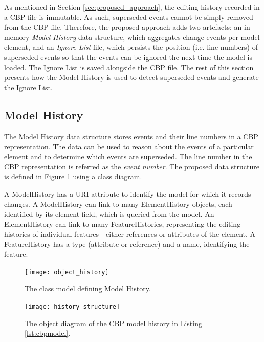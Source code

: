 As mentioned in Section \ref{sec:proposed_approach}, the editing history recorded in a CBP file is immutable. As such, superseded events cannot be simply removed from the CBP file. Therefore, the proposed approach adds two artefacts: an in-memory \textit{Model History} data structure, which aggregates change events per model element, and an \textit{Ignore List} file, which persists the position (i.e. line numbers) of superseded events so that the events can be ignored the next time the model is loaded. The Ignore List is saved alongside the CBP file. The rest of this section presents how the Model History is used to detect superseded events and generate the Ignore List.

\subsection{Model History}
\label{subsec:model_history}
The Model History data structure stores events and their line numbers in a CBP representation. The data can be used to reason about the events of a particular element and to determine which events are superseded. The line number in the CBP representation is referred as the \textit{event number}. The proposed data structure is defined in Figure \ref{fig:object_history} using a class diagram.

A \textsf{ModelHistory} has a \textsf{URI} attribute to identify the model for which it records changes. A \textsf{ModelHistory} can link to many \textsf{ElementHistory} objects, each identified by its \textsf{element} field, which is queried from the model. An \textsf{ElementHistory} can link to many \textsf{FeatureHistories}, representing the editing histories of individual features—either references or attributes of the element. A \textsf{FeatureHistory} has a \textsf{type} (attribute or reference) and a \textsf{name}, identifying the feature.

\begin{figure}[ht]
  \centering
  \texttt{[image: object\_history]}
  \caption{The class model defining Model History.}
  \label{fig:object_history}
\end{figure}

\begin{figure}[ht]
  \centering
  \texttt{[image: history\_structure]}
  \caption{The object diagram of the CBP model history in Listing \ref{lst:cbpmodel}.}
  \label{fig:history_structure}
\end{figure}

